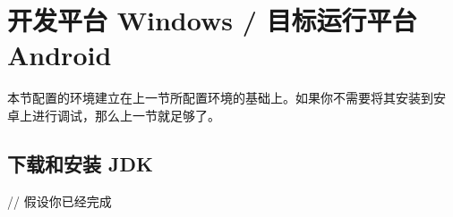\documentclass[a4paper, 10pt]{article}
\begin{document}


\section{开发平台 Windows / 目标运行平台 Android}

本节配置的环境建立在上一节所配置环境的基础上。如果你不需要将其安装到安
卓上进行调试，那么上一节就足够了。

\subsection{下载和安装 JDK}

// 假设你已经完成
  


  

\end{document}
